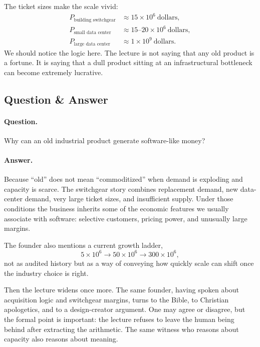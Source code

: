 The ticket sizes make the scale vivid:
\begin{align}
P_{\text{building switchgear}} &\approx 15 \times 10^6 \ \text{dollars},\\
P_{\text{small data center}} &\approx 15\text{--}20 \times 10^6 \ \text{dollars},\\
P_{\text{large data center}} &\approx 1 \times 10^9 \ \text{dollars}.
\end{align}
We should notice the logic here. The lecture is not saying that any old product is a fortune. It is saying that a dull product sitting at an infrastructural bottleneck can become extremely lucrative.

\subsection{Question \& Answer}

\paragraph{Question.} Why can an old industrial product generate software-like money?

\paragraph{Answer.} Because ``old'' does not mean ``commoditized'' when demand is exploding and capacity is scarce. The switchgear story combines replacement demand, new data-center demand, very large ticket sizes, and insufficient supply. Under those conditions the business inherits some of the economic features we usually associate with software: selective customers, pricing power, and unusually large margins.

The founder also mentions a current growth ladder,
\begin{equation}
5 \times 10^6 \to 50 \times 10^6 \to 300 \times 10^6,
\end{equation}
not as audited history but as a way of conveying how quickly scale can shift once the industry choice is right.

Then the lecture widens once more. The same founder, having spoken about acquisition logic and switchgear margins, turns to the Bible, to Christian apologetics, and to a design-creator argument. One may agree or disagree, but the formal point is important: the lecture refuses to leave the human being behind after extracting the arithmetic. The same witness who reasons about capacity also reasons about meaning.

